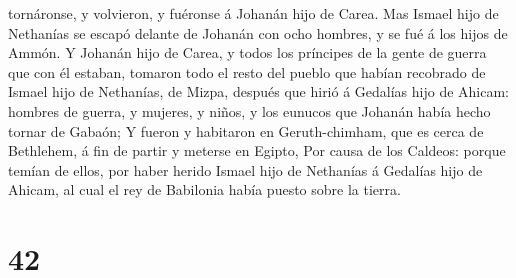 tornáronse, y volvieron, y fuéronse á Johanán hijo de Carea.
 Mas Ismael hijo de Nethanías se escapó delante de Johanán
con ocho hombres, y se fué á los hijos de Ammón.  Y Johanán
hijo de Carea, y todos los príncipes de la gente de guerra que con él
estaban, tomaron todo el resto del pueblo que habían recobrado de Ismael
hijo de Nethanías, de Mizpa, después que hirió á Gedalías hijo de
Ahicam: hombres de guerra, y mujeres, y niños, y los eunucos que Johanán
había hecho tornar de Gabaón;  Y fueron y habitaron en
Geruth-chimham, que es cerca de Bethlehem, á fin de partir y meterse en
Egipto,  Por causa de los Caldeos: porque temían de ellos,
por haber herido Ismael hijo de Nethanías á Gedalías hijo de Ahicam, al
cual el rey de Babilonia había puesto sobre la tierra.

\hypertarget{section-41}{%
\section{42}\label{section-41}}

